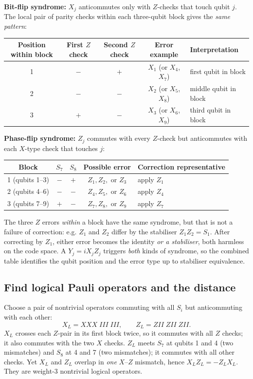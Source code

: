 \textbf{Bit-flip syndrome:} $X_j$ anticommutes only with $Z$-checks that touch qubit $j$. The local pair of parity checks within each three-qubit block gives the \emph{same pattern}:
\begin{center}
\small
\begin{tabular}{@{}ccccl@{}}\toprule
Position within block&First $Z$ check&Second $Z$ check&Error example&Interpretation\\\midrule
1&$-$&$+$&$X_1$ (or $X_4$, $X_7$)&first qubit in block\\
2&$-$&$-$&$X_2$ (or $X_5$, $X_8$)&middle qubit in block\\
3&$+$&$-$&$X_3$ (or $X_6$, $X_9$)&third qubit in block\\\bottomrule
\end{tabular}
\end{center}
\textbf{Phase-flip syndrome:} $Z_j$ commutes with every $Z$-check but anticommutes with each $X$-type check that touches $j$:
\begin{center}
\small
\begin{tabular}{@{}ccccl@{}}\toprule
Block&$S_7$&$S_8$&Possible error&Correction representative\\\midrule
1 (qubits 1--3)&$-$&$+$&$Z_1,Z_2,$ or $Z_3$&apply $Z_1$\\
2 (qubits 4--6)&$-$&$-$&$Z_4,Z_5,$ or $Z_6$&apply $Z_4$\\
3 (qubits 7--9)&$+$&$-$&$Z_7,Z_8,$ or $Z_9$&apply $Z_7$\\\bottomrule
\end{tabular}
\end{center}
The three $Z$ errors \emph{within} a block have the same syndrome, but that is not a failure of correction: e.g. $Z_1$ and $Z_2$ differ by the stabiliser $Z_1Z_2=S_1$. After correcting by $Z_1$, either error becomes the identity \emph{or a stabiliser}, both harmless on the code space. A $Y_j=iX_jZ_j$ triggers \emph{both} kinds of syndrome, so the combined table identifies the qubit position and the error type up to stabiliser equivalence.

\subsection{Find logical Pauli operators and the distance}
Choose a pair of nontrivial operators commuting with all $S_i$ but anticommuting with each other:
\begin{equation}
\boxed{X_L=XXX\;III\;III,\qquad Z_L=ZII\;ZII\;ZII.}\label{eq:logicalshor}
\end{equation}
$X_L$ crosses each $Z$-pair in its first block twice, so it commutes with all $Z$ checks; it also commutes with the two $X$ checks. $Z_L$ meets $S_7$ at qubits 1 and 4 (two mismatches) and $S_8$ at 4 and 7 (two mismatches); it commutes with all other checks. Yet $X_L$ and $Z_L$ overlap in \emph{one} $X$--$Z$ mismatch, hence $X_LZ_L=-Z_LX_L$. They are weight-3 nontrivial logical operators.


